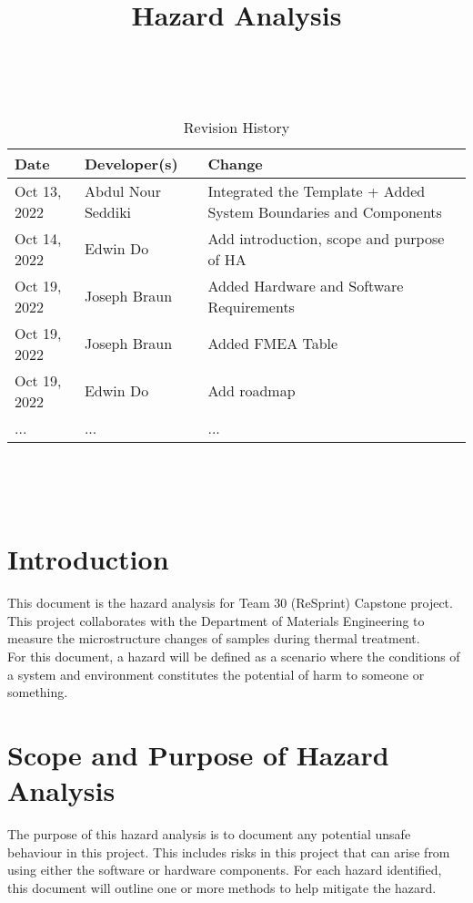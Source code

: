 \documentclass{article}
\title{Hazard Analysis\\\progname}
\author{\authname}
\date{}
\begin{document}
\maketitle
\thispagestyle{empty}

~\newpage


\begin{table}[hp]
\caption{Revision History} \label{TblRevisionHistory}
\begin{tabularx}{\textwidth}{llX}
\toprule
\textbf{Date} & \textbf{Developer(s)} & \textbf{Change}\\
\midrule
Oct 13, 2022 & Abdul Nour Seddiki & Integrated the Template + Added System Boundaries and Components\\
Oct 14, 2022 & Edwin Do & Add introduction, scope and purpose of HA \\
Oct 19, 2022 & Joseph Braun & Added Hardware and Software Requirements \\
Oct 19, 2022 & Joseph Braun & Added FMEA Table\\
Oct 19, 2022 & Edwin Do & Add roadmap \\

... & ... & ...\\
\bottomrule
\end{tabularx}
\end{table}

~\newpage

\tableofcontents

~\newpage



\section{Introduction}
This document is the hazard analysis for Team 30 (ReSprint) Capstone project. 
This project collaborates with the Department of Materials Engineering to measure the microstructure changes of samples during thermal treatment.\\

\noindent For this document, a hazard will be defined as 
a scenario where the conditions of a system and environment constitutes the potential of harm to someone or something.

\section{Scope and Purpose of Hazard Analysis}
The purpose of this hazard analysis is to document any potential unsafe behaviour in this project. 
This includes risks in this project that can arise from using either the software or hardware components.
For each hazard identified, this document will outline one or more methods to help mitigate the hazard.\\
\end{document}

